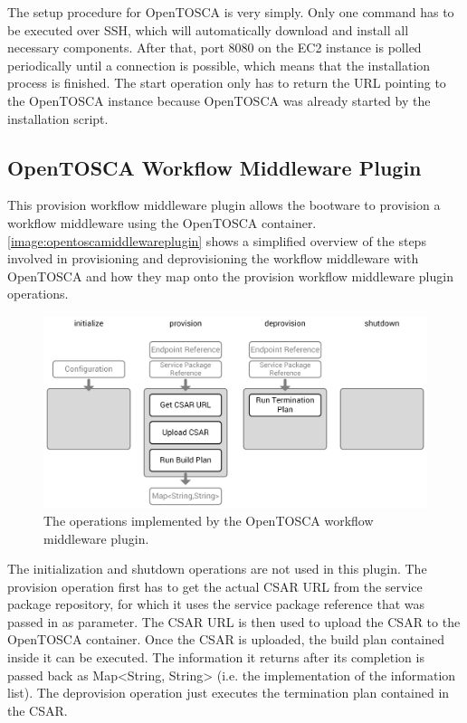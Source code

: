 The setup procedure for OpenTOSCA is very simply.
Only one command has to be executed over SSH, which will automatically download and install all necessary components.
After that, port 8080 on the EC2 instance is polled periodically until a connection is possible, which means that the installation process is finished.
The start operation only has to return the URL pointing to the OpenTOSCA instance because OpenTOSCA was already started by the installation script.

\subsection{OpenTOSCA Workflow Middleware Plugin}

This provision workflow middleware plugin allows the bootware to provision a workflow middleware using the OpenTOSCA container.
\autoref{image:opentoscamiddlewareplugin} shows a simplified overview of the steps involved in provisioning and deprovisioning the workflow middleware with OpenTOSCA and how they map onto the provision workflow middleware plugin operations.

\begin{figure}[!htbp]
	\centering
	\includegraphics[resolution=600]{implementation/assets/opentosca_middleware_plugin}
	\caption{The operations implemented by the OpenTOSCA workflow middleware plugin.}
	\label{image:opentoscamiddlewareplugin}
\end{figure}

The initialization and shutdown operations are not used in this plugin.
The provision operation first has to get the actual CSAR URL from the service package repository, for which it uses the service package reference that was passed in as parameter.
The CSAR URL is then used to upload the CSAR to the OpenTOSCA container.
Once the CSAR is uploaded, the build plan contained inside it can be executed.
The information it returns after its completion is passed back as Map<String, String> (i.e. the implementation of the information list).
The deprovision operation just executes the termination plan contained in the CSAR.

